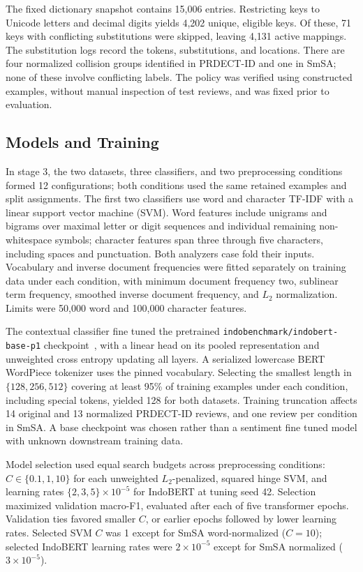 The fixed dictionary snapshot contains 15,006 entries. Restricting keys to Unicode letters and decimal digits yields 4,202 unique, eligible keys. Of these, 71 keys with conflicting substitutions were skipped, leaving 4,131 active mappings. The substitution logs record the tokens, substitutions, and locations. There are four normalized collision groups identified in PRDECT-ID and one in SmSA; none of these involve conflicting labels. The policy was verified using constructed examples, without manual inspection of test reviews, and was fixed prior to evaluation.

\subsection{Models and Training}
In stage 3, the two datasets, three classifiers, and two preprocessing conditions formed 12 configurations; both conditions used the same retained examples and split assignments. The first two classifiers use word and character TF-IDF with a linear support vector machine (SVM). Word features include unigrams and bigrams over maximal letter or digit sequences and individual remaining non-whitespace symbols; character features span three through five characters, including spaces and punctuation. Both analyzers case fold their inputs. Vocabulary and inverse document frequencies were fitted separately on training data under each condition, with minimum document frequency two, sublinear term frequency, smoothed inverse document frequency, and $L_2$ normalization. Limits were 50,000 word and 100,000 character features.

The contextual classifier fine tuned the pretrained \texttt{indobenchmark/indobert-base-p1} checkpoint~\cite{wilie2020}, with a linear head on its pooled representation and unweighted cross entropy updating all layers. A serialized lowercase BERT WordPiece tokenizer uses the pinned vocabulary. Selecting the smallest length in $\{128,256,512\}$ covering at least 95\% of training examples under each condition, including special tokens, yielded 128 for both datasets. Training truncation affects 14 original and 13 normalized PRDECT-ID reviews, and one review per condition in SmSA. A base checkpoint was chosen rather than a sentiment fine tuned model with unknown downstream training data.

Model selection used equal search budgets across preprocessing conditions: $C\in\{0.1,1,10\}$ for each unweighted $L_2$-penalized, squared hinge SVM, and learning rates $\{2,3,5\}\times10^{-5}$ for IndoBERT at tuning seed 42. Selection maximized validation macro-F1, evaluated after each of five transformer epochs. Validation ties favored smaller $C$, or earlier epochs followed by lower learning rates. Selected SVM $C$ was 1 except for SmSA word-normalized ($C=10$); selected IndoBERT learning rates were $2\times10^{-5}$ except for SmSA normalized ($3\times10^{-5}$).


